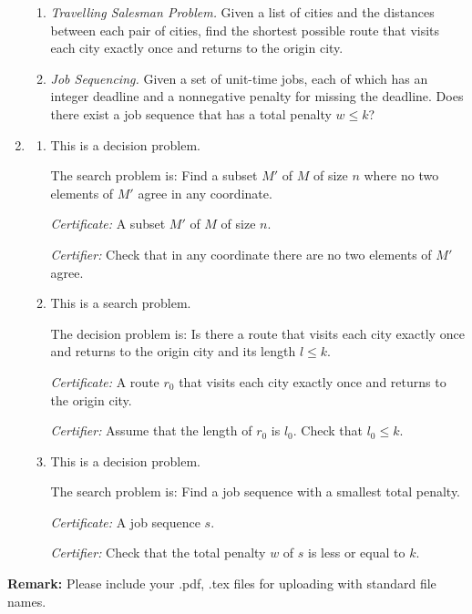 \documentclass[12pt,a4paper]{article}
\makeatletter
\newtheorem*{solution}{Solution}
\theoremstyle{definition}
\renewenvironment{solution}[1][Solution] {\par\pushQED{\qed}\normalfont\topsep6\p@\@plus6\p@\relax\trivlist\item[\hskip\labelsep\bfseries#1\@addpunct{.}]\ignorespaces}{\popQED\endtrivlist\@endpefalse} \makeatother
\makeatother
\begin{document}
\begin{enumerate}
\begin{enumerate}
	    \item 
	    \textit{Travelling Salesman Problem.} Given a list of cities and the distances between each pair of cities, find the shortest possible route that visits each city exactly once and returns to the origin city.
	    
	    \item
	    \textit{Job Sequencing.} Given a set of unit-time jobs, each of which has an integer deadline and a nonnegative penalty for missing the deadline. Does there exist a job sequence that has a total penalty $w\leqslant k$?
	    
	\end{enumerate}

	\begin{solution}
		\begin{enumerate}
			\item This is a decision problem.
			
			The search problem is: Find a subset $M'$ of $M$ of size $n$ where no two elements of $M'$ agree in any coordinate.

			\textit{Certificate:} A subset $M'$ of $M$ of size $n$.
			
			\textit{Certifier:} Check that in any coordinate there are no two elements of $M'$ agree.

			\item This is a search problem.
			
			The decision problem is: Is there a route that visits each city exactly once and returns to the origin city and its length $ l \leqslant k $.
			
			\textit{Certificate:} A route $ r_0 $ that visits each city exactly once and returns to the origin city.
			
			\textit{Certifier:} Assume that the length of $ r_0 $ is $ l_0 $. Check that $ l_0 \leqslant  k$. 

			\item This is a decision problem.
			
			The search problem is: Find a job sequence with a smallest total penalty.
			
			
			\textit{Certificate:} A job sequence $ s $.
			
			\textit{Certifier:} Check that the total penalty $w$ of $ s $ is less or equal to $ k $.

		\end{enumerate}
	\end{solution}

\end{enumerate}

\textbf{Remark:} Please include your .pdf, .tex files for uploading with standard file names.
\newpage


\end{document}
